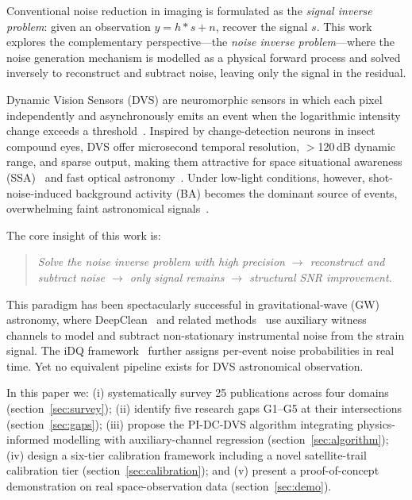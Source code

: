 \documentclass[12pt]{article}
\begin{document}
Conventional noise reduction in imaging is formulated as the \emph{signal inverse problem}: given an observation $y = h * s + n$, recover the signal $s$.
This work explores the complementary perspective---the \emph{noise inverse problem}---where the noise generation mechanism is modelled as a physical forward process and solved inversely to reconstruct and subtract noise, leaving only the signal in the residual.

Dynamic Vision Sensors (DVS) are neuromorphic sensors in which each pixel independently and asynchronously emits an event when the logarithmic intensity change exceeds a threshold~\cite{A1,A4}.
Inspired by change-detection neurons in insect compound eyes, DVS offer microsecond temporal resolution, $>$120\,dB dynamic range, and sparse output, making them attractive for space situational awareness (SSA)~\cite{C1,C3,C4} and fast optical astronomy~\cite{C5}.
Under low-light conditions, however, shot-noise-induced background activity (BA) becomes the dominant source of events, overwhelming faint astronomical signals~\cite{A1,A2}.

The core insight of this work is:
\begin{quote}
\emph{Solve the noise inverse problem with high precision $\rightarrow$ reconstruct and subtract noise $\rightarrow$ only signal remains $\rightarrow$ structural SNR improvement.}
\end{quote}

This paradigm has been spectacularly successful in gravitational-wave (GW) astronomy, where DeepClean~\cite{D1} and related methods~\cite{D2,D3,D4} use auxiliary witness channels to model and subtract non-stationary instrumental noise from the strain signal.
The iDQ framework~\cite{D6} further assigns per-event noise probabilities in real time.
Yet no equivalent pipeline exists for DVS astronomical observation.

In this paper we: (i) systematically survey 25 publications across four domains (section~\ref{sec:survey}); (ii) identify five research gaps G1--G5 at their intersections (section~\ref{sec:gaps}); (iii) propose the PI-DC-DVS algorithm integrating physics-informed modelling with auxiliary-channel regression (section~\ref{sec:algorithm}); (iv) design a six-tier calibration framework including a novel satellite-trail calibration tier (section~\ref{sec:calibration}); and (v) present a proof-of-concept demonstration on real space-observation data (section~\ref{sec:demo}).


\end{document}
